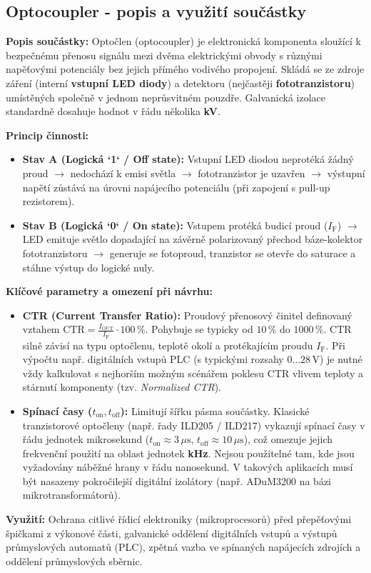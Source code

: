 \documentclass[a4paper, 12pt]{article}
\begin{document}
        \subsection{Optocoupler - popis a využití součástky}
        \textbf{Popis součástky:} Optočlen (optocoupler) je elektronická komponenta sloužící k bezpečnému přenosu signálu mezi dvěma elektrickými obvody s různými napěťovými potenciály bez jejich přímého vodivého propojení. Skládá se ze zdroje záření (interní \textbf{vstupní LED diody}) a detektoru (nejčastěji \textbf{fototranzistoru}) umístěných společně v jednom neprůsvitném pouzdře. Galvanická izolace standardně dosahuje hodnot v řádu několika \textbf{kV}.

        \textbf{Princip činnosti:}
        \begin{itemize}
            \item \textbf{Stav A (Logická `1` / Off state):} Vstupní LED diodou neprotéká žádný proud $\rightarrow$ nedochází k emisi světla $\rightarrow$ fototranzistor je uzavřen $\rightarrow$ výstupní napětí zůstává na úrovni napájecího potenciálu (při zapojení s pull-up rezistorem).
            \item \textbf{Stav B (Logická `0` / On state):} Vstupem protéká budicí proud ($I_{\text{F}}$) $\rightarrow$ LED emituje světlo dopadající na závěrně polarizovaný přechod báze-kolektor fototranzistoru $\rightarrow$ generuje se fotoproud, tranzistor se otevře do saturace a stáhne výstup do logické nuly.
        \end{itemize}

        \textbf{Klíčové parametry a omezení při návrhu:}
        \begin{itemize}
            \item \textbf{CTR (Current Transfer Ratio):} Proudový přenosový činitel definovaný vztahem $\text{CTR} = \frac{I_{\text{OUT}}}{I_{\text{F}}} \cdot 100\,\%$. Pohybuje se typicky od $10\,\%$ do $1000\,\%$. CTR silně závisí na typu optočlenu, teplotě okolí a protékajícím proudu $I_{\text{F}}$. Při výpočtu např. digitálních vstupů PLC (s typickými rozsahy $0\dots28\,\text{V}$) je nutné vždy kalkulovat s nejhorším možným scénářem poklesu CTR vlivem teploty a stárnutí komponenty (tzv. \textit{Normalized CTR}).
            \item \textbf{Spínací časy ($t_{\text{on}}, t_{\text{off}}$):} Limitují šířku pásma součástky. Klasické tranzistorové optočleny (např. řady ILD205 / ILD217) vykazují spínací časy v řádu jednotek mikrosekund ($t_{\text{on}} \approx 3\,\mu\text{s}$, $t_{\text{off}} \approx 10\,\mu\text{s}$), což omezuje jejich frekvenční použití na oblast jednotek \textbf{kHz}. Nejsou použitelné tam, kde jsou vyžadovány náběžné hrany v řádu nanosekund. V takových aplikacích musí být nasazeny pokročilejší digitální izolátory (např. ADuM3200 na bázi mikrotransformátorů).
        \end{itemize}
        \textbf{Využití:} Ochrana citlivé řídicí elektroniky (mikroprocesorů) před přepěťovými špičkami z výkonové části, galvanické oddělení digitálních vstupů a výstupů průmyslových automatů (PLC), zpětná vazba ve spínaných napájecích zdrojích a oddělení průmyslových sběrnic.
\end{document}
